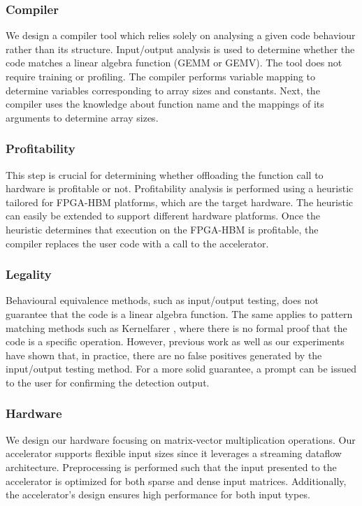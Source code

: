 \documentclass[manuscript,screen,review]{acmart}
\begin{document}
\subsubsection{Compiler} We design a compiler tool which relies solely on analysing a given code behaviour rather than its structure. Input/output analysis is used to determine whether the code matches a linear algebra function (GEMM or GEMV). The tool does not require training or profiling. The compiler performs variable mapping to determine variables corresponding to array sizes and constants. Next, the compiler uses the knowledge about function name and the mappings of its arguments to determine array sizes. 

\subsubsection{Profitability}
This step is crucial for determining whether offloading the function call to hardware is profitable or not. Profitability analysis is performed using a heuristic tailored for FPGA-HBM platforms, which are the target hardware. The heuristic can easily be extended to support different hardware platforms. Once the heuristic determines that execution on the FPGA-HBM is profitable, the compiler replaces the user code with a call to the accelerator.

\subsubsection{Legality} 
Behavioural equivalence methods, such as input/output testing, does not guarantee that the code is a linear algebra function. The same applies to pattern matching methods such as Kernelfarer \cite{kernelfarer}, where there is no formal proof that the code is a specific operation. However, previous work as well as our experiments \cite{ATC} have shown that, in practice, there are no false positives generated by the input/output testing method. For a more solid guarantee, a prompt can be issued to the user for confirming the detection output. 

\subsubsection{Hardware}
We design our hardware focusing on matrix-vector multiplication operations. Our accelerator supports flexible input sizes since it leverages a streaming dataflow architecture. Preprocessing is performed such that the input presented to the accelerator is optimized for both sparse and dense input matrices. Additionally, the accelerator's design ensures high performance for both input types.
\end{document}
